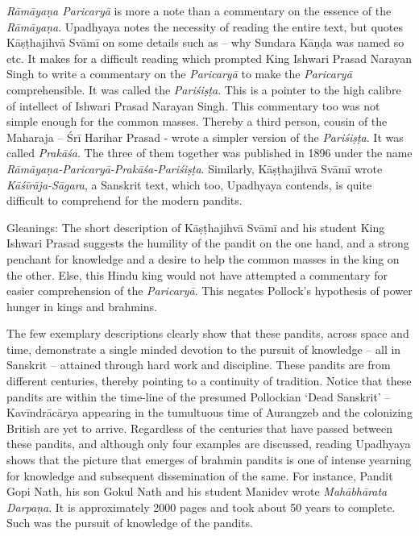 \begin{enumerate}
 \textit{Rāmāyaṇa Paricaryā} is more a note than a commentary on the essence of the \textit{Rāmāyaṇa}. Upadhyaya notes the necessity of reading the entire text, but quotes Kāṣṭhajihvā Svāmī on some details such as – why Sundara Kāṇḍa was named so etc. It makes for a difficult reading which prompted King Ishwari Prasad Narayan Singh to write a commentary on the \textit{Paricaryā} to make the \textit{Paricaryā} comprehensible. It was called the \textit{Pariśiṣṭa}. This is a pointer to the high calibre of intellect of Ishwari Prasad Narayan Singh. This commentary too was not simple enough for the common masses. Thereby a third person, cousin of the Maharaja – Śrī Harihar Prasad - wrote a simpler version of the \textit{Pariśiṣṭa}. It was called \textit{Prakāśa}. The three of them together was published in 1896 under the name \textit{Rāmāyaṇa-Paricaryā-Prakāśa-Pariśiṣṭa}. Similarly, Kāṣṭhajihvā Svāmī wrote \textit{Kāśīrāja-Sāgara}, a Sanskrit text, which too, Upadhyaya contends, is quite difficult to comprehend for the modern pandits.

 Gleanings: The short description of Kāṣṭhajihvā Svāmī and his student King Ishwari Prasad suggests the humility of the pandit on the one hand, and a strong penchant for knowledge and a desire to help the common masses in the king on the other. Else, this Hindu king would not have attempted a commentary for easier comprehension of the \textit{Paricaryā}. This negates Pollock’s hypothesis of power hunger in kings and brahmins.

 The few exemplary descriptions clearly show that these pandits, across space and time, demonstrate a single minded devotion to the pursuit of knowledge – all in Sanskrit – attained through hard work and discipline. These pandits are from different centuries, thereby pointing to a continuity of tradition. Notice that these pandits are within the time-line of the presumed Pollockian ‘Dead Sanskrit’ – Kavīndrācārya appearing in the tumultuous time of Aurangzeb and the colonizing British are yet to arrive. Regardless of the centuries that have passed between these pandits, and although only four examples are discussed, reading Upadhyaya shows that the picture that emerges of brahmin pandits is one of intense yearning for knowledge and subsequent dissemination of the same. For instance, Pandit Gopi Nath, his son Gokul Nath and his student Manidev wrote \textit{Mahābhārata Darpaṇa}. It is approximately 2000 pages and took about 50 years to complete. Such was the pursuit of knowledge of the pandits.


\end{enumerate}
